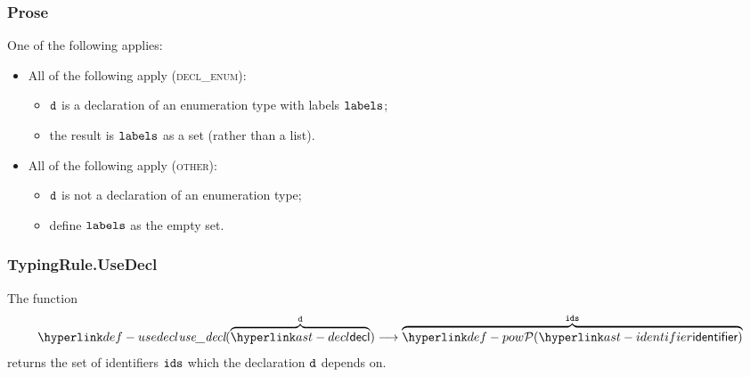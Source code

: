 \subsubsection{Prose}
One of the following applies:
\begin{itemize}
  \item All of the following apply (\textsc{decl\_enum}):
  \begin{itemize}
    \item $\texttt{d}$ is a declaration of an enumeration type with labels $\texttt{labels}$;
    \item the result is $\texttt{labels}$ as a set (rather than a list).
  \end{itemize}

  \item All of the following apply (\textsc{other}):
  \begin{itemize}
    \item $\texttt{d}$ is not a declaration of an enumeration type;
    \item define $\texttt{labels}$ as the empty set.
  \end{itemize}
\end{itemize}


\subsubsection{TypingRule.UseDecl \label{sec:TypingRule.UseDecl}}
\hypertarget{def-usedecl}{}
The function
\[
\usedecl(\overname{\decl}{\vd}) \aslto \overname{\pow{\identifier}}{\ids}
\]
returns the set of identifiers $\texttt{ids}$ which the declaration $\texttt{d}$ depends on.

